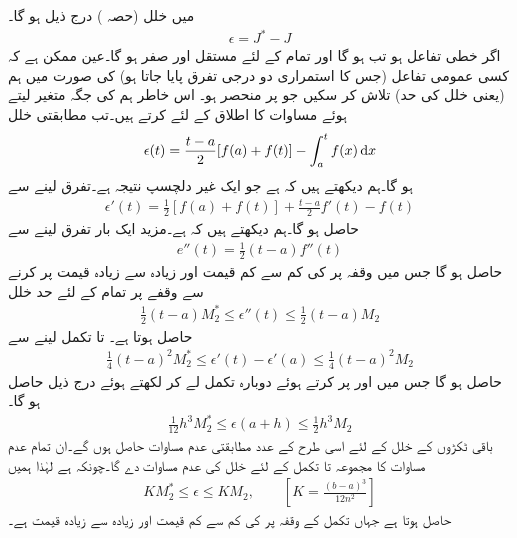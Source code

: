  میں خلل (حصہ )  درج ذیل ہو گا۔
\begin{align*}
\epsilon=J^*-J
\end{align*}
اگر  خطی تفاعل ہو تب  ہو گا اور تمام  کے لئے   مستقل اور  صفر ہو گا۔عین ممکن ہے کہ کسی عمومی تفاعل  (جس کا استمراری دو درجی تفرق پایا جاتا ہو)  کی صورت میں ہم   (یعنی خلل  کی حد) تلاش کر سکیں جو  پر منحصر ہو۔ اس خاطر ہم  کی جگہ متغیر  لیتے ہوئے  مساوات  کا اطلاق  کے لئے کرتے ہیں۔تب مطابقتی خلل
\begin{align*}
\epsilon(t)=\frac{t-a}{2}[f(a)+f(t)]-\int_a^t f(x)\dif x
\end{align*}
ہو گا۔ہم دیکھتے ہیں کہ  ہے جو ایک غیر دلچسپ نتیجہ ہے۔تفرق لینے سے
\begin{align*}
\epsilon'(t)=\frac{1}{2}[f(a)+f(t)]+\frac{t-a}{2}f'(t)-f(t)
\end{align*}
حاصل ہو گا۔ہم دیکھتے ہیں کہ  ہے۔مزید ایک بار تفرق لینے سے
\begin{align*}
e''(t)=\frac{1}{2}(t-a)f''(t)
\end{align*}
حاصل ہو گا جس میں وقفہ  پر  کی کم سے کم قیمت   اور زیادہ سے زیادہ قیمت   پر کرنے سے وقفے پر تمام  کے لئے  حد خلل
\begin{align*}
\frac{1}{2}(t-a)M_2^*\le \epsilon''(t)\le \frac{1}{2}(t-a)M_2
\end{align*}
حاصل ہوتا ہے۔ تا  تکمل لینے سے
\begin{align*}
\frac{1}{4}(t-a)^2M_2^*\le \epsilon'(t)-\epsilon'(a)\le \frac{1}{4}(t-a)^2M_2
\end{align*}
حاصل ہو گا جس میں  اور  پر کرتے ہوئے دوبارہ تکمل لے کر  لکھتے ہوئے درج ذیل حاصل ہو گا۔
\begin{align*}
\frac{1}{12}h^3M_2^*\le \epsilon(a+h)\le \frac{1}{2}h^3M_2
\end{align*}
باقی  ٹکڑوں کے خلل کے لئے اسی طرح کے  عدد مطابقتی عدم مساوات  حاصل ہوں گے۔ان تمام  عدم مساوات کا مجموعہ  تا  تکمل کے لئے خلل  کی عدم مساوات دے گا۔چونکہ  ہے لہٰذا ہمیں
\begin{align}\label{مساوات_اعدادی_حد_خلل}
KM_2^*\le \epsilon\le KM_2,\quad \quad [K=\tfrac{(b-a)^3}{12n^2}]
\end{align}
حاصل ہوتا ہے جہاں تکمل کے  وقفہ پر  کی کم سے کم قیمت  اور زیادہ سے زیادہ قیمت  ہے۔

